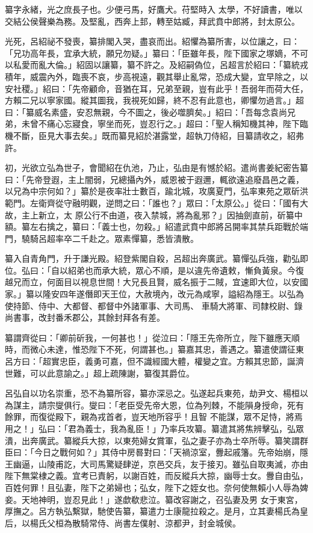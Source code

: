 \begin{pinyinscope}
 纂字永緒，光之庶長子也。少便弓馬，好鷹犬。苻堅時入
 太學，不好讀書，唯以交結公侯聲樂為務。及堅亂，西奔上邽，轉至姑臧，拜武賁中郎將，封太原公。



 光死，呂紹祕不發喪，纂排閣入哭，盡哀而出。紹懼為纂所害，以位讓之，曰：「兄功高年長，宜承大統，願兄勿疑。」纂曰：「臣雖年長，陛下國家之塚嫡，不可以私愛而亂大倫。」紹固以讓纂，纂不許之。及紹嗣偽位，呂超言於紹曰：「纂統戎積年，威震內外，臨喪不哀，步高視遠，觀其舉止亂常，恐成大變，宜早除之，以安社稷。」紹曰：「先帝顧命，音猶在耳，兄弟至親，豈有此乎！吾弱年而荷大任，方賴二兄以寧家國。縱其圖我，我視死如歸，終不忍有此意也，卿懼勿過言。」超
 曰：「纂威名素盛，安忍無親，今不圖之，後必噬臍矣。」紹曰：「吾每念袁尚兄弟，未曾不痛心忘寢食，寧坐而死，豈忍行之。」超曰：「聖人稱知機其神，陛下臨機不斷，臣見大事去矣。」既而纂見紹於湛露堂，超執刀侍紹，目纂請收之，紹弗許。



 初，光欲立弘為世子，會聞紹在仇池，乃止，弘由是有憾於紹。遣尚書姜紀密告纂曰：「先帝登遐，主上闇弱，兄總攝內外，威恩被于遐邇，輒欲遠追廢昌邑之義，以兄為中宗何如？」纂於是夜率壯士數百，踰北城，攻廣夏門，弘率東苑之眾斫洪範門。左衛齊從守融明觀，逆問之曰：「誰也？」眾曰：「太原公。」從曰：「國有大故，主上新立，太
 原公行不由道，夜入禁城，將為亂邪？」因抽劍直前，斫纂中額。纂左右擒之，纂曰：「義士也，勿殺。」紹遣武賁中郎將呂開率其禁兵距戰於端門，驍騎呂超率卒二千赴之。眾素憚纂，悉皆潰散。



 纂入自青角門，升于謙光殿。紹登紫閣自殺，呂超出奔廣武。纂憚弘兵強，勸弘即位。弘曰：「自以紹弟也而承大統，眾心不順，是以違先帝遺敕，慚負黃泉。今復越兄而立，何面目以視息世間！大兄長且賢，威名振于二賊，宜速即大位，以安國家。」纂以隆安四年遂僭即天王位，大赦境內，改元為咸寧，謚紹為隱王。以弘為使持節、侍中、大都督、都督中外諸軍事、大司馬、
 車騎大將軍、司隸校尉、錄尚書事，改封番禾郡公，其餘封拜各有差。



 纂謂齊從曰：「卿前斫我，一何甚也！」從泣曰：「隱王先帝所立，陛下雖應天順時，而微心未達，惟恐陛下不死，何謂甚也。」纂嘉其忠，善遇之。纂遣使謂征東呂方曰：「超實忠臣，義勇可嘉，但不識經國大體，權變之宜。方賴其忠節，誕濟世難，可以此意諭之。」超上疏陳謝，纂復其爵位。



 呂弘自以功名崇重，恐不為纂所容，纂亦深忌之。弘遂起兵東苑，劫尹文、楊桓以為謀主，請宗燮俱行。燮曰：「老臣受先帝大恩，位為列棘，不能隕身授命，死有餘罪，而復從殿下，親為戎首者，豈天地所容乎！且智
 不能謀，眾不足恃，將焉用之！」弘曰：「君為義士，我為亂臣！」乃率兵攻纂。纂遣其將焦辨擊弘，弘眾潰，出奔廣武。纂縱兵大掠，以東苑婦女賞軍，弘之妻子亦為士卒所辱。纂笑謂群臣曰：「今日之戰何如？」其侍中房晷對曰：「天禍涼室，釁起戚籓。先帝始崩，隱王幽逼，山陵甫訖，大司馬驚疑肆逆，京邑交兵，友于接刃。雖弘自取夷滅，亦由陛下無棠棣之義。宜考已責躬，以謝百姓，而反縱兵大掠，幽辱士女。釁自由弘，百姓何罪！且弘妻，陛下之弟婦也；弘女，陛下之姪女也。奈何使無賴小人辱為婢妾。天地神明，豈忍見此！」遂歔欷悲泣。纂改容謝之，召弘妻及男
 女于東宮，厚撫之。呂方執弘繫獄，馳使告纂，纂遣力士康龍拉殺之。是月，立其妻楊氏為皇后，以楊氏父桓為散騎常侍、尚書左僕射、涼都尹，封金城侯。




\end{pinyinscope}
